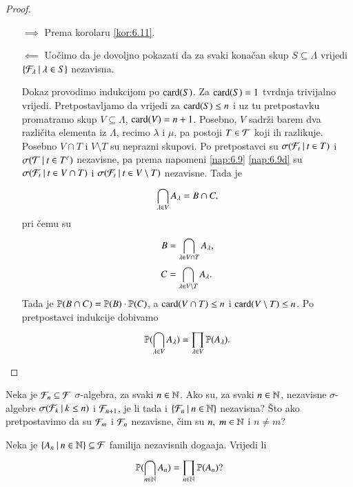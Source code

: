 \begin{proof}
    \quad
    \begin{enumerate}
        \item[$\implies$] Prema korolaru \ref{kor:6.11}.
        \item[$\impliedby$] Uo\v cimo da je dovoljno pokazati da za svaki kona\v can skup $S \subseteq \Lambda$ vrijedi $\{{\mathcal{F}_\lambda} \: | \: {\lambda \in S}\}$ nezavisna.
        
        Dokaz provodimo indukcijom po $\textnormal{card}({S})$.
        Za $\textnormal{card}({S}) = 1$ tvrdnja trivijalno vrijedi.
        Pretpostavljamo da vrijedi za $\textnormal{card}({S}) \leq n$ i uz tu pretpostavku promatramo skup $V \subseteq \Lambda$, $\textnormal{card}({V}) = n + 1$.
        Posebno, $V$ sadr\v zi barem dva razli\v cita elementa iz $\Lambda$, recimo $\lambda$ i $\mu$, pa postoji $T \in \mathcal{T}$ koji ih razlikuje.
        Posebno $V \cap T$ i $V \setminus T$ su neprazni skupovi.
        Po pretpostavci su $\sigma({\mathcal{F}_t} \: | \: {t \in T})$ i $\sigma({\mathcal{T}} \: | \: {t \in T^c})$ nezavisne, pa prema napomeni \ref{nap:6.9}  \ref{nap:6.9d} su $\sigma({\mathcal{F}_t} \: | \: {t \in V \cap T})$ i $\sigma({\mathcal{F}_t} \: | \: {t \in V \setminus T})$ nezavisne.
        Tada je
        \begin{equation*}
            \bigcap\limits_{\lambda \in V}^{} A_\lambda = B \cap C,
        \end{equation*}
        pri \v cemu su
        \begin{equation*}
            \begin{aligned}
                B &= \bigcap\limits_{\lambda \in V \cap T}^{} A_\lambda,\\
                C &= \bigcap\limits_{\lambda \in V \setminus T}^{} A_\lambda.
            \end{aligned}
        \end{equation*}
        Tada je $\mathbb{P}({B \cap C}) = \mathbb{P}({B}) \cdot \mathbb{P}({C})$, a $\textnormal{card}({V \cap T}) \leq n$ i $\textnormal{card}({V \setminus T}) \leq n$.
        Po pretpostavci indukcije dobivamo
        \begin{equation*}
            \mathbb{P}({\bigcap\limits_{\lambda \in V}^{} A_\lambda}) = \prod\limits_{\lambda \in V}^{} \mathbb{P}({A_\lambda}).
        \end{equation*}
    \end{enumerate}
\end{proof}

\begin{zad} \label{zad:6.13}
    Neka je $\mathcal{F}_n \subseteq \mathcal{F}$ $\sigma$-algebra, za svaki $n \in \mathbb{N}$.
    Ako su, za svaki $n \in \mathbb{N}$, nezavisne $\sigma$-algebre $\sigma({\mathcal{F}_k} \: | \: {k \leq n})$ i $\mathcal{F}_{n + 1}$, je li tada i $\{{\mathcal{F}_n} \: | \: {n \in \mathbb{N}}\}$ nezavisna?
    \v Sto ako pretpostavimo da su $\mathcal{F}_m$ i $\mathcal{F}_n$ nezavisne, \v cim su $n, \; m \in \mathbb{N}$ i $n \neq m$?
\end{zad}

\begin{zad} \label{zad:6.14}
    Neka je $\{{A_n} \: | \: {n \in \mathbb{N}}\} \subseteq \mathcal{F}$ familija nezavisnih doga\dj aja.
    Vrijedi li
    \begin{equation*}
        \mathbb{P}({\bigcap\limits_{n \in \mathbb{N}}^{} A_n}) = \prod\limits_{n \in \mathbb{N}}^{} \mathbb{P}({A_n})?
    \end{equation*}
\end{zad}